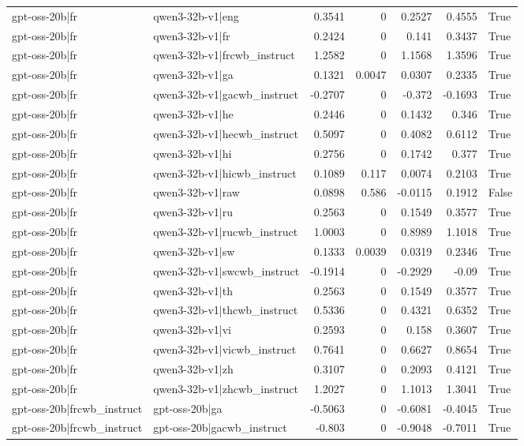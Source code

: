 \begin{table}
\begin{tabular}{l l r r r r l}
gpt-oss-20b|fr & qwen3-32b-v1|eng & 0.3541 & 0 & 0.2527 & 0.4555 & True \\
gpt-oss-20b|fr & qwen3-32b-v1|fr & 0.2424 & 0 & 0.141 & 0.3437 & True \\
gpt-oss-20b|fr & qwen3-32b-v1|frcwb_instruct & 1.2582 & 0 & 1.1568 & 1.3596 & True \\
gpt-oss-20b|fr & qwen3-32b-v1|ga & 0.1321 & 0.0047 & 0.0307 & 0.2335 & True \\
gpt-oss-20b|fr & qwen3-32b-v1|gacwb_instruct & -0.2707 & 0 & -0.372 & -0.1693 & True \\
gpt-oss-20b|fr & qwen3-32b-v1|he & 0.2446 & 0 & 0.1432 & 0.346 & True \\
gpt-oss-20b|fr & qwen3-32b-v1|hecwb_instruct & 0.5097 & 0 & 0.4082 & 0.6112 & True \\
gpt-oss-20b|fr & qwen3-32b-v1|hi & 0.2756 & 0 & 0.1742 & 0.377 & True \\
gpt-oss-20b|fr & qwen3-32b-v1|hicwb_instruct & 0.1089 & 0.117 & 0.0074 & 0.2103 & True \\
gpt-oss-20b|fr & qwen3-32b-v1|raw & 0.0898 & 0.586 & -0.0115 & 0.1912 & False \\
gpt-oss-20b|fr & qwen3-32b-v1|ru & 0.2563 & 0 & 0.1549 & 0.3577 & True \\
gpt-oss-20b|fr & qwen3-32b-v1|rucwb_instruct & 1.0003 & 0 & 0.8989 & 1.1018 & True \\
gpt-oss-20b|fr & qwen3-32b-v1|sw & 0.1333 & 0.0039 & 0.0319 & 0.2346 & True \\
gpt-oss-20b|fr & qwen3-32b-v1|swcwb_instruct & -0.1914 & 0 & -0.2929 & -0.09 & True \\
gpt-oss-20b|fr & qwen3-32b-v1|th & 0.2563 & 0 & 0.1549 & 0.3577 & True \\
gpt-oss-20b|fr & qwen3-32b-v1|thcwb_instruct & 0.5336 & 0 & 0.4321 & 0.6352 & True \\
gpt-oss-20b|fr & qwen3-32b-v1|vi & 0.2593 & 0 & 0.158 & 0.3607 & True \\
gpt-oss-20b|fr & qwen3-32b-v1|vicwb_instruct & 0.7641 & 0 & 0.6627 & 0.8654 & True \\
gpt-oss-20b|fr & qwen3-32b-v1|zh & 0.3107 & 0 & 0.2093 & 0.4121 & True \\
gpt-oss-20b|fr & qwen3-32b-v1|zhcwb_instruct & 1.2027 & 0 & 1.1013 & 1.3041 & True \\
gpt-oss-20b|frcwb_instruct & gpt-oss-20b|ga & -0.5063 & 0 & -0.6081 & -0.4045 & True \\
gpt-oss-20b|frcwb_instruct & gpt-oss-20b|gacwb_instruct & -0.803 & 0 & -0.9048 & -0.7011 & True \\

\end{tabular}
\end{table}
